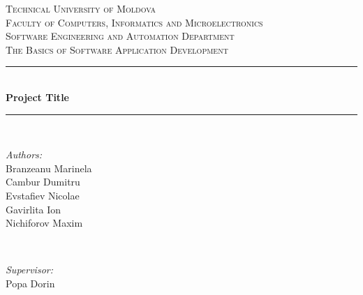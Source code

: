\begin{titlepage}
	
	
	\newcommand{\HRule}{\rule{\linewidth}{0.5mm}} 

	\begin{center}

	\textsc{\large Technical University of Moldova} \\[0.5cm]
	\textsc{\large Faculty of Computers, Informatics and Microelectronics} \\[0.5cm]
	\textsc{\large Software Engineering and Automation Department} \\[5cm] 
	
	\textsc{\Large The Basics of Software Application Development} \\[0.5cm] 


	\HRule \\[0.5cm]
	\LARGE{\textbf{Project Title}} \\[0.1cm]
	\HRule \\[5cm]

	\begin{minipage}{0.4\textwidth}
		\begin{flushleft} \large
			\emph{Authors:}\\
			Branzeanu Marinela\\
			Cambur Dumitru\\
			Evstafiev Nicolae\\
			Gavirlita Ion\\
			Nichiforov Maxim
		\end{flushleft}
	\end{minipage}
	~
	\begin{minipage}{0.4\textwidth}
		\begin{flushright} \large
			\emph{Supervisor:} \\
			Popa Dorin
		\end{flushright}
	\end{minipage}\\[4cm]


\end{center}
\end{titlepage}
